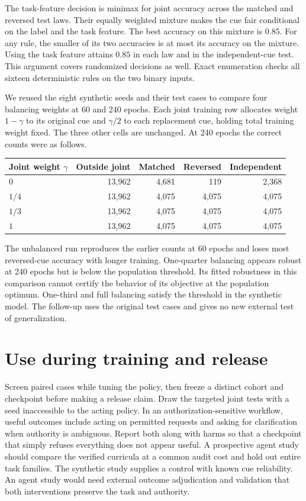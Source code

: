 \documentclass[11pt]{article}
\begin{document}
The task-feature decision is minimax for joint accuracy across
the matched and reversed test laws. Their equally weighted
mixture makes the cue fair conditional on the label and the
task feature. The best accuracy on this mixture is $0.85$.
For any rule, the smaller of its two accuracies is at most its
accuracy on the mixture. Using the task feature attains $0.85$
in each law and in the independent-cue test. This argument
covers randomized decisions as well. Exact enumeration checks
all sixteen deterministic rules on the two binary inputs.

We reused the eight synthetic seeds and their test cases to
compare four balancing weights at 60 and 240 epochs. Each
joint training row allocates weight $1-\gamma$ to its original
cue and $\gamma/2$ to each replacement cue, holding total
training weight fixed. The three other cells are unchanged.
At 240 epochs the correct counts were as follows.
\begin{center}
\small
\begin{tabular}{lrrrr}
\toprule
Joint weight $\gamma$ & Outside joint & Matched & Reversed & Independent \\
\midrule
$0$   & 13,962 & 4,681 & 119   & 2,368 \\
$1/4$ & 13,962 & 4,075 & 4,075 & 4,075 \\
$1/3$ & 13,962 & 4,075 & 4,075 & 4,075 \\
$1$   & 13,962 & 4,075 & 4,075 & 4,075 \\
\bottomrule
\end{tabular}
\end{center}
The unbalanced run reproduces the earlier counts at 60 epochs
and loses most reversed-cue accuracy with longer training.
One-quarter balancing appears robust at 240 epochs but is
below the population threshold. Its fitted robustness in this
comparison cannot certify the behavior of its objective at the
population optimum. One-third and full balancing satisfy the
threshold in the synthetic model. The follow-up uses the
original test cases and gives no new external test of generalization.

\section{Use during training and release}
Screen paired cases while tuning the policy, then freeze a distinct
cohort and checkpoint before making a release claim. Draw the
targeted joint tests with a seed inaccessible to the acting policy.
In an authorization-sensitive workflow, useful outcomes include
acting on permitted requests and asking for clarification when
authority is ambiguous. Report both along with harms so that a
checkpoint that simply refuses everything does not appear useful.
A prospective agent study should compare the verified curricula
at a common audit cost and hold out entire task families. The
synthetic study supplies a control with known cue reliability.
An agent study would need external outcome adjudication and
validation that both interventions preserve the task and authority.
\end{document}
